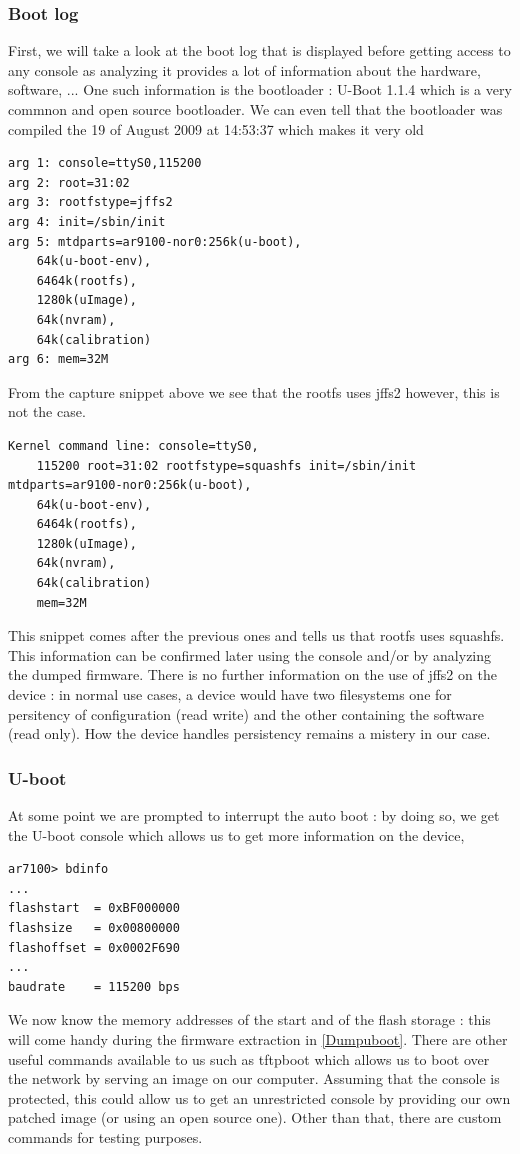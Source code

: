 \documentclass{article}
\begin{document}
\subsubsection{Boot log}
First, we will take a look at the boot log that is displayed before getting access to any console as analyzing it provides a lot of information about the hardware, software, ... One such information is the bootloader : U-Boot 1.1.4 which is a very commnon and open source bootloader. We can even tell that the bootloader was compiled the 19 of August 2009 at 14:53:37 which makes it very old
\begin{lstlisting}
arg 1: console=ttyS0,115200
arg 2: root=31:02
arg 3: rootfstype=jffs2
arg 4: init=/sbin/init
arg 5: mtdparts=ar9100-nor0:256k(u-boot),
	64k(u-boot-env),
	6464k(rootfs),
	1280k(uImage),
	64k(nvram),
	64k(calibration)
arg 6: mem=32M
\end{lstlisting}
 From the capture snippet above we see that the rootfs uses jffs2 however, this is not the case.
\begin{lstlisting}
Kernel command line: console=ttyS0,
	115200 root=31:02 rootfstype=squashfs init=/sbin/init mtdparts=ar9100-nor0:256k(u-boot),
	64k(u-boot-env),
	6464k(rootfs),
	1280k(uImage),
	64k(nvram),
	64k(calibration) 
	mem=32M 	
\end{lstlisting}
This snippet comes after the previous ones and tells us that rootfs uses squashfs. This information can be confirmed later using the console and/or by analyzing the dumped firmware. There is no further information on the use of jffs2 on the device : in normal use cases, a device would have two filesystems one for persitency of configuration (read write) and the other containing the software (read only). How the device handles persistency remains a mistery in our case.
\subsubsection{U-boot}\label{ubootinfo}
At some point we are prompted to interrupt the auto boot : by doing so, we get the U-boot console which allows us to get more information on the device,
\begin{lstlisting}
ar7100> bdinfo
...
flashstart  = 0xBF000000
flashsize   = 0x00800000
flashoffset = 0x0002F690
...
baudrate    = 115200 bps	
\end{lstlisting}
We now know the memory addresses of the start and of the flash storage : this will come handy during the firmware extraction in \ref{Dumpuboot}. There are other useful commands available to us such as tftpboot which allows us to boot over the network by serving an image on our computer. Assuming that the console is protected, this could allow us to get an unrestricted console by providing our own patched image (or using an open source one). Other than that, there are custom commands for testing purposes.
\end{document}
